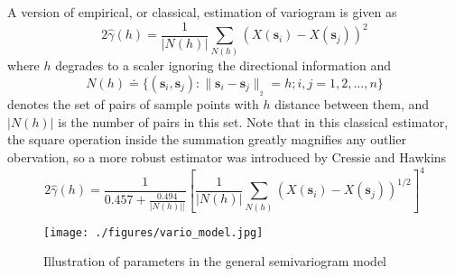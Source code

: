 \documentclass[english]{article}
\numberwithin{equation}{section}
\numberwithin{table}{section}
\numberwithin{figure}{section}
\newcommand{\norm}[2]{\|{#1}\|_{{}_{#2}}}
\newcommand{\bms}{\bm{s}}
\begin{document}
A version of empirical, or classical, estimation of variogram is given as
\begin{equation} \label{varioest0}
  2\hat{\gamma}(h) = \frac{1}{|N(h)|} \sum_{N(h)} \left( X(\bms_i)
  - X(\bms_j) \right)^2 
\end{equation}
where $h$ degrades to a scaler ignoring the directional information and 
\begin{equation} \label{Nhdef}
  N(h) \doteq \{ (\bms_i, \bms_j) : \norm{\bms_i - \bms_j}{2} = h; i,j = 1,2,...,n \}
\end{equation}
denotes the set of pairs of sample points with $h$ distance between
them, and $|N(h)|$ is the number of pairs in this set. Note that in
this classical estimator, the square operation inside the summation
greatly magnifies any outlier obervation, so a more robust estimator
was introduced by Cressie and Hawkins\cite{Cressie93}
\begin{equation} \label{varioest1}
  2\hat{\gamma}(h) = \frac{1}{0.457+\frac{0.494}{|N(h)||}}\left[\frac{1}{|N(h)|}
  \sum_{N(h)} (X(\bms_i) - X(\bms_j))^{1/2}\right]^4
\end{equation}


\begin{figure} \centering
  \texttt{[image: ./figures/vario\_model.jpg]}
  \caption{Illustration of parameters in the general semivariogram model}
  \label{vario_model}
\end{figure}
\end{document}
